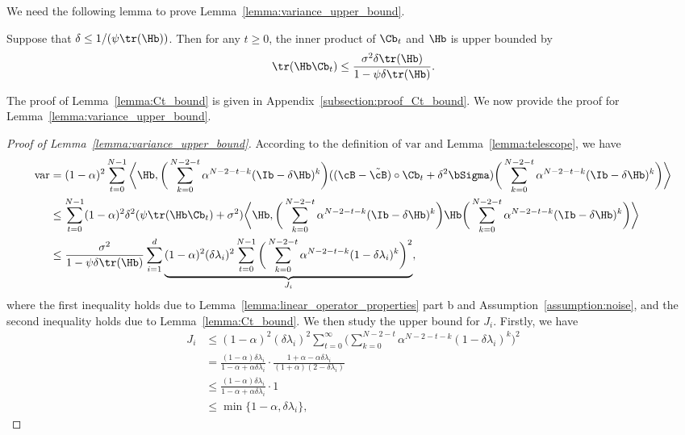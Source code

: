 \documentclass[11pt]{article}
\begin{document}
We need the following lemma to prove Lemma~\ref{lemma:variance_upper_bound}.
\begin{lemma}\label{lemma:Ct_bound}
Suppose that $\delta\le1/(\psi\tr(\Hb))$. Then for any $t\ge0$, the inner product of $\Cb_t$ and $\Hb$ is upper bounded by
\begin{align*}
\tr(\Hb\Cb_t)\le\frac{\sigma^2\delta\tr(\Hb)}{1-\psi\delta\tr(\Hb)}.
\end{align*}
\end{lemma}
The proof of Lemma~\ref{lemma:Ct_bound} is given in Appendix~\ref{subsection:proof_Ct_bound}. We now provide the proof for Lemma~\ref{lemma:variance_upper_bound}.
\begin{proof}[Proof of Lemma~\ref{lemma:variance_upper_bound}]
According to the definition of $\mathrm{var}$ and Lemma~\ref{lemma:telescope}, we have
\begin{align}
\mathrm{var}&=(1-\alpha)^2\sum_{t=0}^{N-1}\bigg\langle\Hb, \bigg(\sum_{k=0}^{N-2-t}\alpha^{N-2-t-k}(\Ib-\delta\Hb)^k\bigg)((\cB-\tilde\cB)\circ\Cb_t+\delta^2\bSigma)\bigg(\sum_{k=0}^{N-2-t}\alpha^{N-2-t-k}(\Ib-\delta\Hb)^k\bigg)\bigg\rangle\nonumber\\
&\le\sum_{t=0}^{N-1}(1-\alpha)^2\delta^2(\psi\tr(\Hb\Cb_t)+\sigma^2)\bigg\langle\Hb, \bigg(\sum_{k=0}^{N-2-t}\alpha^{N-2-t-k}(\Ib-\delta\Hb)^k\bigg)\Hb\bigg(\sum_{k=0}^{N-2-t}\alpha^{N-2-t-k}(\Ib-\delta\Hb)^k\bigg)\bigg\rangle\nonumber\\
&\le\frac{\sigma^2}{1-\psi\delta\tr(\Hb)}\sum_{i=1}^d\underbrace{(1-\alpha)^2(\delta\lambda_i)^2\sum_{t=0}^{N-1}\bigg(\sum_{k=0}^{N-2-t}\alpha^{N-2-t-k}(1-\delta\lambda_i)^k\bigg)^2}_{J_i},\label{eq:var_upper_bound}
\end{align}
where the first inequality holds due to Lemma~\ref{lemma:linear_operator_properties} part b and Assumption~\ref{assumption:noise}, and the second inequality holds due to Lemma~\ref{lemma:Ct_bound}.
We then study the upper bound for $J_i$. Firstly, we have
\begin{align}
J_i&\le(1-\alpha)^2(\delta\lambda_i)^2\sum_{t=0}^\infty\bigg(\sum_{k=0}^{N-2-t}\alpha^{N-2-t-k}(1-\delta\lambda_i)^k\bigg)^2\nonumber\\
&=\frac{(1-\alpha)\delta\lambda_i}{1-\alpha+\alpha\delta\lambda_i}\cdot\frac{1+\alpha-\alpha\delta\lambda_i}{(1+\alpha)(2-\delta\lambda_i)}\nonumber\\
&\le\frac{(1-\alpha)\delta\lambda_i}{1-\alpha+\alpha\delta\lambda_i}\cdot1\nonumber\\
&\le\min\{1-\alpha, \delta\lambda_i\},\label{eq:Ji_bound1}

\end{align}
\end{proof}
\end{document}
